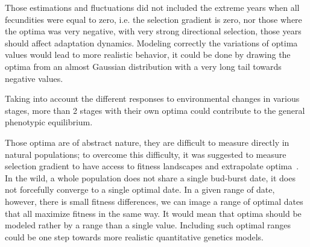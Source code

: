 Those estimations and fluctuations did not included the extreme years when all fecundities were equal to zero, i.e. the selection gradient is zero, nor those where the optima was very negative, with very strong directional selection, those years should affect adaptation dynamics. Modeling correctly the variations of optima values would lead to more realistic behavior, it could be done by drawing the optima from an almost Gaussian distribution with a very long tail towards negative values.

Taking into account the different responses to environmental changes in various stages, more than 2 stages with their own optima could contribute to the general phenotypic equilibrium.

Those optima are of abstract nature, they are difficult to measure directly in natural populations; to overcome this difficulty, it was suggested to measure selection gradient to have access to fitness landscapes and extrapolate optima~\citep{lynch_evolution_1993}. In the wild, a whole population does not share a single bud-burst date, it does not forcefully converge to a single optimal date. In a given range of date, however, there is small fitness differences, we can image a range of optimal dates that all maximize fitness in the same way. It would mean that optima should be modeled rather by a range than a single value. Including such optimal ranges could be one step towards more realistic quantitative genetics models.